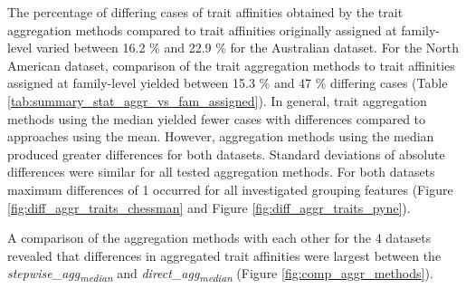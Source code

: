 \documentclass{article}
\begin{document}
The percentage of differing cases of trait affinities obtained by the trait aggregation methods compared to trait affinities originally assigned at family-level varied between 16.2 \% and 22.9 \% for the Australian dataset. For the North American dataset, comparison of the trait aggregation methods to trait affinities assigned at family-level yielded between 15.3 \% and 47 \% differing cases (Table \ref{tab:summary_stat_aggr_vs_fam_assigned}). In general, trait aggregation methods using the median yielded fewer cases with differences compared to approaches using the mean. However, aggregation methods using the median produced greater differences for both datasets. Standard deviations of absolute differences were similar for all tested aggregation methods. For both datasets maximum differences of 1 occurred for all investigated grouping features (Figure \ref{fig:diff_aggr_traits_chessman} and Figure \ref{fig:diff_aggr_traits_pyne}).

A comparison of the aggregation methods with each other for the 4 datasets revealed that differences in aggregated trait affinities were largest between the \textit{stepwise\_agg\textsubscript{median}} and \textit{direct\_agg\textsubscript{median}} (Figure \ref{fig:comp_aggr_methods}).
\end{document}
